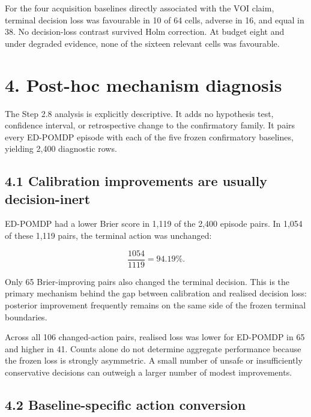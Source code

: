 \documentclass[11pt,a4paper]{article}
\begin{document}
For the four acquisition baselines directly associated with the VOI claim, terminal decision loss was favourable in 10 of 64 cells, adverse in 16, and equal in 38. No decision-loss contrast survived Holm correction. At budget eight and under degraded evidence, none of the sixteen relevant cells was favourable.

\section*{4. Post-hoc mechanism diagnosis}

The Step 2.8 analysis is explicitly descriptive. It adds no hypothesis test, confidence interval, or retrospective change to the confirmatory family. It pairs every ED-POMDP episode with each of the five frozen confirmatory baselines, yielding 2,400 diagnostic rows.

\subsection*{4.1 Calibration improvements are usually decision-inert}

ED-POMDP had a lower Brier score in 1,119 of the 2,400 episode pairs. In 1,054 of these 1,119 pairs, the terminal action was unchanged:

\[
\frac{1054}{1119}=94.19\%.
\]

Only 65 Brier-improving pairs also changed the terminal decision. This is the primary mechanism behind the gap between calibration and realised decision loss: posterior improvement frequently remains on the same side of the frozen terminal boundaries.

Across all 106 changed-action pairs, realised loss was lower for ED-POMDP in 65 and higher in 41. Counts alone do not determine aggregate performance because the frozen loss is strongly asymmetric. A small number of unsafe or insufficiently conservative decisions can outweigh a larger number of modest improvements.

\subsection*{4.2 Baseline-specific action conversion}
\end{document}
